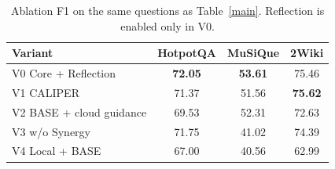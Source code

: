 \begin{table}[pos=!htb]
\caption{Ablation F1 on the same questions as Table~\ref{main}. Reflection is enabled only in V0.}
\label{ablation}
\centering
\fontsize{8}{10}\selectfont
\setlength{\tabcolsep}{3pt}
\begin{tabular}{lccc}
\toprule
\textbf{Variant} & \textbf{HotpotQA} & \textbf{MuSiQue} & \textbf{2Wiki} \\
\midrule
V0 Core + Reflection & \textbf{72.05} & \textbf{53.61} & 75.46 \\
V1 CALIPER & 71.37 & 51.56 & \textbf{75.62} \\
V2 BASE + cloud guidance & 69.53 & 52.31 & 72.63 \\
V3 w/o Synergy & 71.75 & 41.02 & 74.39 \\
V4 Local + BASE & 67.00 & 40.56 & 62.99 \\
\bottomrule
\end{tabular}
\end{table}
